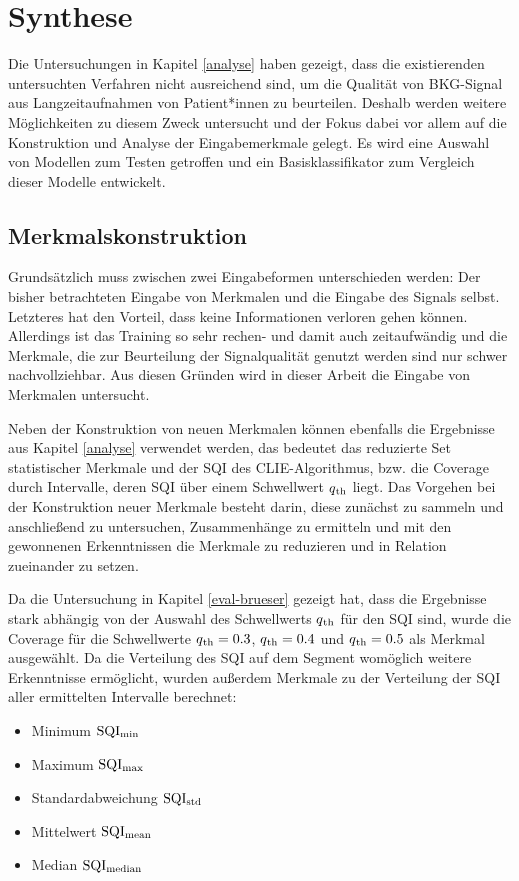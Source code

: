 \chapter{Synthese}\label{synthese}

Die Untersuchungen in Kapitel \ref{analyse} haben gezeigt, dass die existierenden untersuchten Verfahren nicht ausreichend sind, um die Qualität von \ac{BKG}-Signal aus Langzeitaufnahmen von Patient*innen zu beurteilen. Deshalb werden weitere Möglichkeiten zu diesem Zweck untersucht und der Fokus dabei vor allem auf die Konstruktion und Analyse der Eingabemerkmale gelegt. Es wird eine Auswahl von Modellen zum Testen getroffen und ein Basisklassifikator zum Vergleich dieser Modelle entwickelt.

\section{Merkmalskonstruktion}

Grundsätzlich muss zwischen zwei Eingabeformen unterschieden werden: Der bisher betrachteten Eingabe von Merkmalen und die Eingabe des Signals selbst. Letzteres hat den Vorteil, dass keine Informationen verloren gehen können. Allerdings ist das Training so sehr rechen- und damit auch zeitaufwändig und die Merkmale, die zur Beurteilung der Signalqualität genutzt werden sind nur schwer nachvollziehbar. Aus diesen Gründen wird in dieser Arbeit die Eingabe von Merkmalen untersucht.

Neben der Konstruktion von neuen Merkmalen können ebenfalls die Ergebnisse aus Kapitel \ref{analyse} verwendet werden, das bedeutet das reduzierte Set statistischer Merkmale und der \ac{SQI} des \ac{CLIE}-Algorithmus, bzw. die Coverage durch Intervalle, deren \ac{SQI} über einem Schwellwert $q\textsubscript{th}$ liegt. Das Vorgehen bei der Konstruktion neuer Merkmale besteht darin, diese zunächst zu sammeln und anschließend zu untersuchen, Zusammenhänge zu ermitteln und mit den gewonnenen Erkenntnissen die Merkmale zu reduzieren und in Relation zueinander zu setzen.

Da die Untersuchung in Kapitel \ref{eval-brueser} gezeigt hat, dass die Ergebnisse stark abhängig von der Auswahl des Schwellwerts $q\textsubscript{th}$ für den \ac{SQI} sind, wurde die Coverage für die Schwellwerte $q\textsubscript{th} = 0.3$, $q\textsubscript{th} = 0.4$ und $q\textsubscript{th} = 0.5$ als Merkmal ausgewählt. Da die Verteilung des \ac{SQI} auf dem Segment womöglich weitere Erkenntnisse ermöglicht, wurden außerdem Merkmale zu der Verteilung der \ac{SQI} aller ermittelten Intervalle berechnet:
\begin{itemize}
	\item Minimum $\text{SQI}\textsubscript{min}$
	\item Maximum $\text{SQI}\textsubscript{max}$
	\item Standardabweichung $\text{SQI}\textsubscript{std}$
	\item Mittelwert $\text{SQI}\textsubscript{mean}$
	\item Median $\text{SQI}\textsubscript{median}$
\end{itemize}

